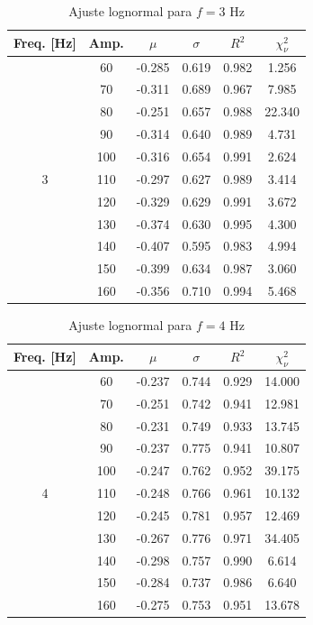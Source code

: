 \begin{table}[h!]
\centering
\begin{tabular}{c c c c c c}
\hline
Freq. [Hz] & Amp. & $\mu$ & $\sigma$ & $R^2$ & $\chi_\nu^2$\\
\hline
\multirow{11}{*}{3} & 60 & -0.285 & 0.619 & 0.982 & 1.256\\
 & 70 & -0.311 & 0.689 & 0.967 & 7.985\\
 & 80 & -0.251 & 0.657 & 0.988 & 22.340\\
 & 90 & -0.314 & 0.640 & 0.989 & 4.731\\
 & 100 & -0.316 & 0.654 & 0.991 & 2.624\\
 & 110 & -0.297 & 0.627 & 0.989 & 3.414\\
 & 120 & -0.329 & 0.629 & 0.991 & 3.672\\
 & 130 & -0.374 & 0.630 & 0.995 & 4.300\\
 & 140 & -0.407 & 0.595 & 0.983 & 4.994\\
 & 150 & -0.399 & 0.634 & 0.987 & 3.060\\
 & 160 & -0.356 & 0.710 & 0.994 & 5.468\\
\hline
\end{tabular}
\caption{Ajuste lognormal para $f=3$ Hz}
\end{table}

\begin{table}[h!]
\centering
\begin{tabular}{c c c c c c}
\hline
Freq. [Hz] & Amp. & $\mu$ & $\sigma$ & $R^2$ & $\chi_\nu^2$\\
\hline
\multirow{11}{*}{4} & 60 & -0.237 & 0.744 & 0.929 & 14.000\\
 & 70 & -0.251 & 0.742 & 0.941 & 12.981\\
 & 80 & -0.231 & 0.749 & 0.933 & 13.745\\
 & 90 & -0.237 & 0.775 & 0.941 & 10.807\\
 & 100 & -0.247 & 0.762 & 0.952 & 39.175\\
 & 110 & -0.248 & 0.766 & 0.961 & 10.132\\
 & 120 & -0.245 & 0.781 & 0.957 & 12.469\\
 & 130 & -0.267 & 0.776 & 0.971 & 34.405\\
 & 140 & -0.298 & 0.757 & 0.990 & 6.614\\
 & 150 & -0.284 & 0.737 & 0.986 & 6.640\\
 & 160 & -0.275 & 0.753 & 0.951 & 13.678\\
\hline
\end{tabular}
\caption{Ajuste lognormal para $f=4$ Hz}
\end{table}

